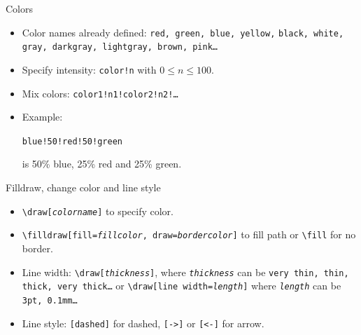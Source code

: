 \documentclass[11pt]{beamer}
\newcommand{\bs}{\textbackslash}
\begin{document}
\begin{frame}{Colors}
  \begin{itemize}
    \item Color names already defined: \texttt{red, green, blue, yellow,}
          \texttt{black, white, gray, darkgray, lightgray, brown, pink\dots}

    \vspace{0.2cm}
    \item Specify intensity: \texttt{color!n} with $0\leq n \leq 100$.

    \vspace{0.2cm}
    \item Mix colors: \texttt{color1!n1!color2!n2!\dots}

    \vspace{0.2cm}
    \item Example:
          \begin{center}
            \texttt{blue!50!red!50!green}
          \end{center}
          is 50\% blue, 25\% red and 25\% green.
  \end{itemize}
\end{frame}

\begin{frame}{Filldraw, change color and line style}
  \begin{itemize}
    \item \texttt{\bs draw[\emph{colorname}]} to specify color.

    \vspace{0.2cm}
    \item \texttt{\bs filldraw[fill=\emph{fillcolor}, draw=\emph{bordercolor}]}
          to fill path or \texttt{\bs fill} for no border.

    \vspace{0.2cm}
    \item Line width: \texttt{\bs draw[\emph{thickness}]}, where
          \texttt{\emph{thickness}} can be \texttt{very thin, thin, thick, very
          thick\dots} or \texttt{\bs draw[line width=\emph{length}]} where
          \texttt{\emph{length}} can be \texttt{3pt, 0.1mm\dots}

    \vspace{0.2cm}
    \item Line style: \texttt{[dashed]} for dashed,
          \texttt{[->]} or \texttt{[<-]} for arrow.
  \end{itemize}
\end{frame}
\end{document}
